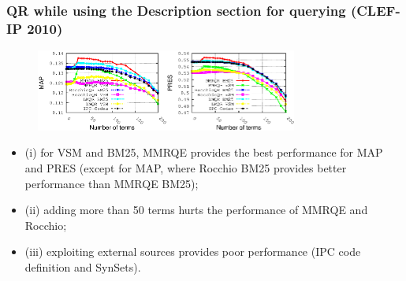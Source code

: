 \documentclass[xcolor=x11names,compress]{beamer}
\renewcommand{\(}{\begin{columns}}
\renewcommand{\)}{\end{columns}}
\newcommand{\<}[1]{\begin{column}{#1}}
\renewcommand{\>}{\end{column}}
\begin{document}
\begin{frame}
\frametitle{QR while using the Description section for querying (CLEF-IP 2010)}

\begin{center}
\begin{figure}
\begin{centering}
\includegraphics[width=4.3cm]{../mmrqrResults/qDescription-sDescription_MAP_2010}\includegraphics[width=4.3cm]{../mmrqrResults/qDescription-sDescription_PRES_2010}
\par\end{centering}
\end{figure}
\par\end{center}

\begin{small}
\begin{itemize}
\item (i) for VSM and BM25, MMRQE
provides the best performance for MAP and PRES (except for MAP,
where Rocchio BM25 provides better performance than MMRQE BM25);

\item (ii) adding more than 50 terms hurts the performance of MMRQE and Rocchio;

\item (iii) exploiting external sources provides poor performance (IPC code definition and SynSets). 
\end{itemize}
\end{small}

\end{frame}
\end{document}
